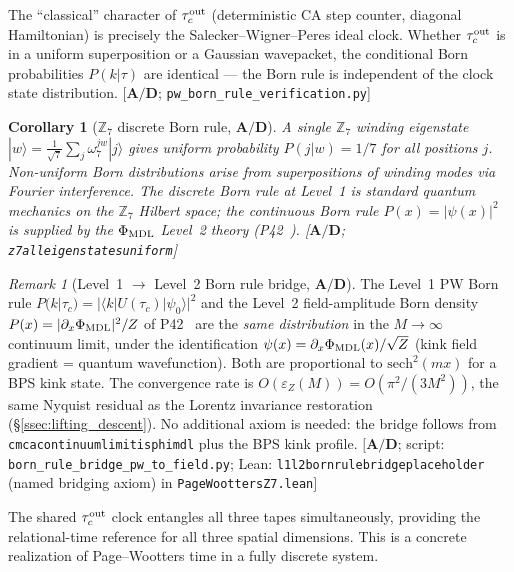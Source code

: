 \documentclass[11pt]{article}
\newtheorem{corollary}[theorem]{Corollary}
\theoremstyle{remark}
\newtheorem{remark}[theorem]{Remark}
\newcommand{\lean}[1]{%
  \penalty-100
  \begingroup\def\_{\textunderscore\allowbreak}\texttt{#1}\endgroup}
\newcommand{\CatAD}{\textbf{A/D}}
\newcommand{\taucout}{\tau_c^{\rm out}}
\begin{document}
The ``classical'' character of $\taucout$ (deterministic CA step counter,
diagonal Hamiltonian) is precisely the Salecker--Wigner--Peres ideal clock.
Whether $\taucout$ is in a uniform superposition or a Gaussian wavepacket,
the conditional Born probabilities $P(k|\tau)$ are identical --- the Born
rule is independent of the clock state distribution.
[$\CatAD$; \texttt{pw\_born\_rule\_verification.py}]

\begin{corollary}[$\mathbb{Z}_7$ discrete Born rule, $\CatAD$]
A single $\mathbb{Z}_7$ winding eigenstate $|w\rangle = \frac{1}{\sqrt{7}}\sum_j \omega_7^{jw}|j\rangle$
gives uniform probability $P(j|w) = 1/7$ for all positions $j$.
Non-uniform Born distributions arise from superpositions of winding modes
via Fourier interference.
The discrete Born rule at Level~1 is standard quantum mechanics on the
$\mathbb{Z}_7$ Hilbert space; the continuous Born rule $P(x) = |\psi(x)|^2$
is supplied by the $\Phi_{\rm MDL}$ Level~2 theory (P42~\cite{SpivackPhiMDLField}).
[$\CatAD$; \lean{z7\_all\_eigenstates\_uniform}]
\end{corollary}

\begin{remark}[Level~1 $\to$ Level~2 Born rule bridge, $\CatAD$]
\label{rem:born-bridge}
The Level~1 PW Born rule $P(k|\tau_c) = |\langle k | U(\tau_c)|\psi_0\rangle|^2$
and the Level~2 field-amplitude Born density $P(x) = |\partial_x\Phi_{\rm MDL}|^2/Z$
of P42~\cite{SpivackPhiMDLField} are the \emph{same distribution} in the $M\to\infty$
continuum limit, under the identification $\psi(x) = \partial_x\Phi_{\rm MDL}(x)/\sqrt{Z}$
(kink field gradient = quantum wavefunction).
Both are proportional to $\mathrm{sech}^2(mx)$ for a BPS kink state.
The convergence rate is $O(\varepsilon_Z(M)) = O(\pi^2/(3M^2))$, the same Nyquist
residual as the Lorentz invariance restoration (\S\ref{ssec:lifting_descent}).
No additional axiom is needed: the bridge follows from
\lean{cmca\_continuum\_limit\_is\_phimdl} plus the BPS kink profile.
$[\CatAD$; script: \texttt{born\_rule\_bridge\_pw\_to\_field.py};
Lean: \lean{l1\_l2\_born\_rule\allowbreak\_bridge\_placeholder} (named bridging
axiom) in \lean{PageWoottersZ7.lean}$]$
\end{remark}

The shared $\taucout$ clock entangles all three tapes simultaneously,
providing the relational-time reference for all three spatial dimensions.
This is a concrete realization of Page--Wootters time in a fully discrete
system.
\end{document}
